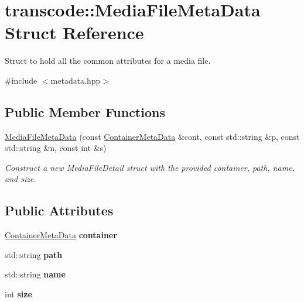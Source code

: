 \hypertarget{structtranscode_1_1MediaFileMetaData}{
\section{transcode::MediaFileMetaData Struct Reference}
\label{structtranscode_1_1MediaFileMetaData}
}


Struct to hold all the common attributes for a media file.  




{\ttfamily \#include $<$metadata.hpp$>$}

\subsection*{Public Member Functions}
\begin{DoxyCompactItemize}
\item 
\hyperlink{structtranscode_1_1MediaFileMetaData_a23221e0853537b4be8280ce2b75b621c}{MediaFileMetaData} (const \hyperlink{structtranscode_1_1ContainerMetaData}{ContainerMetaData} \&cont, const std::string \&p, const std::string \&n, const int \&s)
\begin{DoxyCompactList}\small\item\em Construct a new MediaFileDetail struct with the provided container, path, name, and size. \item\end{DoxyCompactList}\end{DoxyCompactItemize}
\subsection*{Public Attributes}
\begin{DoxyCompactItemize}
\item 
\hypertarget{structtranscode_1_1MediaFileMetaData_a2f713e86bd7ee716c59ef0701930e795}{
\hyperlink{structtranscode_1_1ContainerMetaData}{ContainerMetaData} {\bfseries container}}
\label{structtranscode_1_1MediaFileMetaData_a2f713e86bd7ee716c59ef0701930e795}

\item 
\hypertarget{structtranscode_1_1MediaFileMetaData_a9159286b1d2e7f014d64679088d60d8f}{
std::string {\bfseries path}}
\label{structtranscode_1_1MediaFileMetaData_a9159286b1d2e7f014d64679088d60d8f}

\item 
\hypertarget{structtranscode_1_1MediaFileMetaData_a0102c41b4de772f5c5b0ad0492d33e6d}{
std::string {\bfseries name}}
\label{structtranscode_1_1MediaFileMetaData_a0102c41b4de772f5c5b0ad0492d33e6d}

\item 
\hypertarget{structtranscode_1_1MediaFileMetaData_a52d9764c013a59a8e1c505634af82706}{
int {\bfseries size}}
\label{structtranscode_1_1MediaFileMetaData_a52d9764c013a59a8e1c505634af82706}

\end{DoxyCompactItemize}


